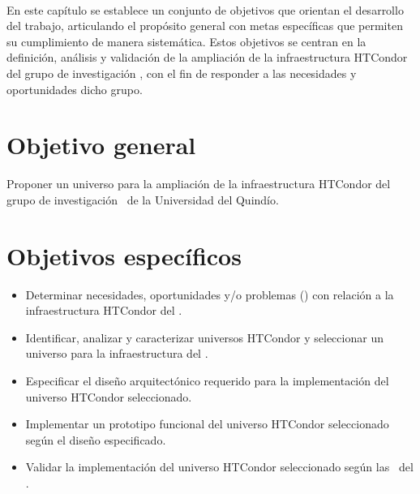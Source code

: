 \label{cap:objetivos}
\mbox{}\\

En este capítulo se establece un conjunto de objetivos que orientan el desarrollo del trabajo, articulando el propósito general con metas específicas que permiten su cumplimiento de manera sistemática. Estos objetivos se centran en la definición, análisis y validación de la ampliación de la infraestructura HTCondor del grupo de investigación \GRID, con el fin de responder a las necesidades y oportunidades dicho grupo.

\section{Objetivo general}\label{cap:objetivoGeneral}

Proponer un universo para la ampliación de la infraestructura HTCondor del grupo de investigación \GRID~de la Universidad del Quindío.


\section{Objetivos específicos}\label{cap:objetivosEspecificos}
\begin{itemize}
	\item Determinar necesidades, oportunidades y/o problemas (\NPO) con relación a la infraestructura HTCondor del \GRID.

	\item Identificar, analizar y caracterizar universos HTCondor y seleccionar un universo para la infraestructura del \GRID.

	\item Especificar el diseño arquitectónico requerido para la implementación del universo HTCondor seleccionado.

	\item Implementar un prototipo funcional del universo HTCondor seleccionado según el diseño especificado.

	\item Validar la implementación del universo HTCondor seleccionado según las \NPO~del \GRID.
\end{itemize}

